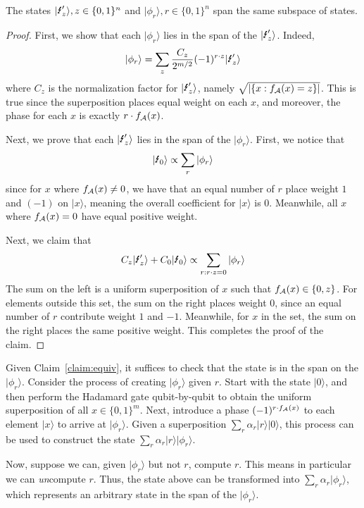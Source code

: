 \begin{claim}\label{claim:equiv} The states $\qlightningp[z], z\in\{0,1\}^n$ and $|\phi_r\rangle, r\in\{0,1\}^n$ span the same subspace of states.
\end{claim}
\begin{proof} First, we show that each $|\phi_r\rangle$ lies in the span of the $\qlightningp[z]$.  Indeed,\[|\phi_r\rangle=\sum_z\frac{C_z}{2^{m/2}} (-1)^{r\cdot z}\qlightningp[z]\]
	where $C_z$ is the normalization factor for $\qlightningp[z]$, namely $\sqrt{|\{x:f_{\mathcal{A}}(x)=z\}|}$.  This is true since the superposition places equal weight on each $x$, and moreover, the phase for each $x$ is exactly $r\cdot f_{\mathcal{A}}(x)$.
	
Next, we prove that each $\qlightningp[z]$ lies in the span of the $|\phi_r\rangle$.  First, we notice that \[\qlightning[0]\propto\sum_r |\phi_r\rangle\]
since for $x$ where $f_{\mathcal{A}}(x)\neq 0$, we have that an equal number of $r$ place weight $1$ and $(-1)$ on $|x\rangle$, meaning the overall coefficient for $|x\rangle$ is 0.  Meanwhile, all $x$ where $f_{\mathcal{A}}(x)=0$ have equal positive weight.

Next, we claim that \[C_z\qlightningp[z]+C_0\qlightning[0]\propto \sum_{r:r\cdot z=0}|\phi_r\rangle\]
The sum on the left is a uniform superposition of $x$ such that $f_{\mathcal{A}}(x)\in\{0,z\}$.  For elements outside this set, the sum on the right places weight 0, since an equal number of $r$ contribute weight $1$ and $-1$.  Meanwhile, for $x$ in the set, the sum on the right places the same positive weight.  This completes the proof of the claim.
\end{proof}

Given Claim~\ref{claim:equiv}, it suffices to check that the state is in the span on the $|\phi_r\rangle$.  Consider the process of creating $|\phi_r\rangle$ given $r$.  Start with the state $|0\rangle$, and then perform the Hadamard gate qubit-by-qubit to obtain the uniform superposition of all $x\in\{0,1\}^m$.  Next, introduce a phase $(-1)^{r\cdot f_{\mathcal{A}}(x)}$ to each element $|x\rangle$ to arrive at $|\phi_r\rangle$.  Given a superposition $\sum_r \alpha_r |r\rangle|0\rangle$, this process can be used to construct the state $\sum_r \alpha_r |r\rangle|\phi_r\rangle$.

Now, suppose we can, given $|\phi_r\rangle$ but not $r$, compute $r$.  This means in particular we can \emph{un}compute $r$.  Thus, the state above can be transformed into $\sum_r \alpha_r |\phi_r\rangle$, which represents an arbitrary state in the span of the $|\phi_r\rangle$.  

